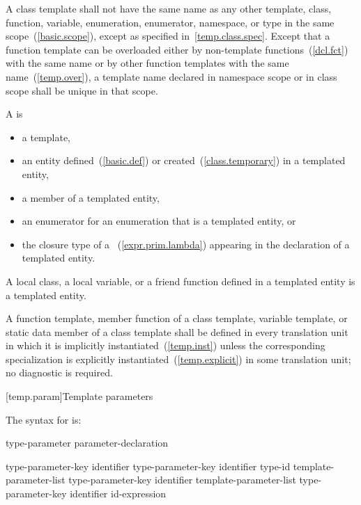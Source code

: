 \pnum
A class template shall not have the same name as any other
template, class, function, variable, enumeration, enumerator, namespace, or
type in the same scope~(\ref{basic.scope}), except as specified in~\ref{temp.class.spec}.
Except that a function template can be overloaded either by non-template
functions~(\ref{dcl.fct}) with the same name or by other function templates
with the same name~(\ref{temp.over}),
a template name declared in namespace scope or in class scope shall be unique
in that scope.

\pnum
{}%
A  is

\begin{itemize}
\item a template,
\item an entity defined~(\ref{basic.def}) or created~(\ref{class.temporary})
      in a templated entity,
\item a member of a templated entity,
\item an enumerator for an enumeration that is a templated entity, or
\item the closure type of a ~(\ref{expr.prim.lambda})
      appearing in the declaration of a templated entity.
\end{itemize}

\begin{note}
A local class, a local variable, or a friend function defined in a
templated entity is a templated entity.
\end{note}

\pnum
A function template, member function of a class template, variable template,
or static data
member of a class template shall be defined in every translation unit in
which it is implicitly instantiated~(\ref{temp.inst}) unless the
corresponding specialization is explicitly instantiated~(\ref{temp.explicit})
in some translation unit; no diagnostic is required.

[temp.param]{Template parameters}

\pnum
The syntax for
is:

\begin{bnf}
\br
  type-parameter\br
  parameter-declaration
\end{bnf}

\begin{bnf}
\br
  type-parameter-key \opt identifier\opt\br
  type-parameter-key identifier\opt{} \terminal{=} type-id\br
   template-parameter-list \terminal{>} type-parameter-key \opt identifier\opt\br
   template-parameter-list \terminal{>} type-parameter-key identifier\opt{} \terminal{=} id-expression
\end{bnf}

